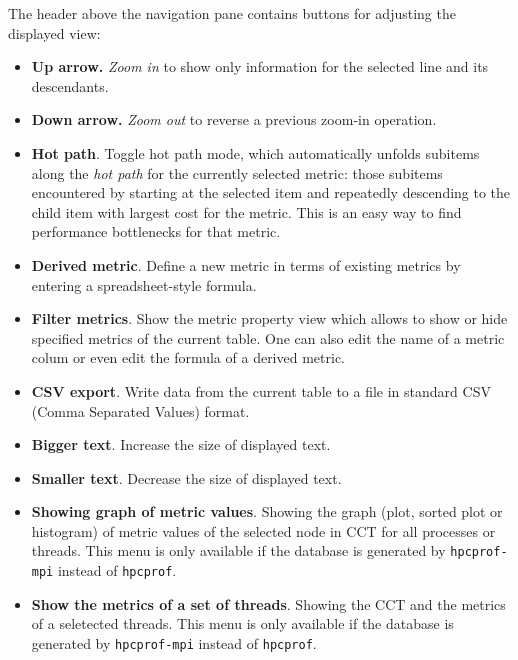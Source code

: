 \documentclass[english]{article}
\begin{document}
\begin{itemize}
The header above the navigation pane contains buttons for adjusting the displayed view:

\begin{itemize}

\item \textbf{Up arrow.} \emph{Zoom in} to show only information for the selected line and its descendants.

\item \textbf{Down arrow.} \emph{Zoom out} to reverse a previous zoom-in operation.

\item \textbf{Hot path}. Toggle hot path mode,
which automatically unfolds subitems along the \emph{hot path} for the currently selected metric:
those subitems encountered by starting at the selected item
and repeatedly descending to the child item with largest cost for the metric.
This is an easy way to find performance bottlenecks for that metric.

\item \textbf{Derived metric}. Define a new metric in terms of existing metrics
by entering a spreadsheet-style formula.

\item \textbf{Filter metrics}. Show the metric property view which allows to show or hide specified metrics of the current table.
One can also edit the name of a metric colum or even edit the formula of a derived metric.

\item \textbf{CSV export}. Write data from the current table to a file
in standard CSV (Comma Separated Values) format.

\item \textbf{Bigger text}. Increase the size of displayed text.

\item \textbf{Smaller text}. Decrease the size of displayed text.

\item \textbf{Showing graph of metric values}.
Showing the graph (plot, sorted plot or histogram) of metric values of the selected node in CCT for all processes or threads.
This menu is only available if the database is generated by \texttt{hpcprof-mpi} instead of \texttt{hpcprof}. 

\item \textbf{Show the metrics of a set of threads}.
Showing the CCT and the metrics of a seletected threads.
This menu is only available if the database is generated by \texttt{hpcprof-mpi} instead of \texttt{hpcprof}. 
 



\end{itemize}
\end{itemize}
\end{document}
